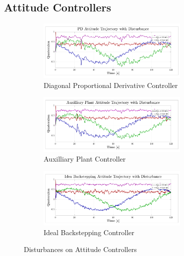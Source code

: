 \subsection{Attitude Controllers}
\label{app:disturbance.attitude}
\begin{figure}[htbp]
\centering
\begin{subfigure}{\textwidth}
\vspace{-12pt}
\centering
\includegraphics[width=0.8\textwidth]{graphs/PD_Diagonal_Trajectory_dist}
\vspace{-12pt}
\caption{Diagonal Proportional Derivative Controller}
\label{fig:app-attitude-pd-dist}
\end{subfigure}
\begin{subfigure}{\textwidth}
\vspace{-3pt}
\centering
\includegraphics[width=0.8\textwidth]{graphs/XPD_Trajectory_dist}
\vspace{-12pt}
\caption{Auxilliary Plant Controller}
\label{fig:app-attitude-xpd-dist}
\end{subfigure}
\begin{subfigure}{\textwidth}
\vspace{-3pt}
\centering
\includegraphics[width=0.8\textwidth]{graphs/IBC_Trajectory_dist}
\vspace{-10pt}
\caption{Ideal Backstepping Controller}
\label{fig:app-attitude-ibc-dist}
\end{subfigure}
\vspace{-3pt}
\caption{Disturbances on Attitude Controllers}
\end{figure}
\newpage
